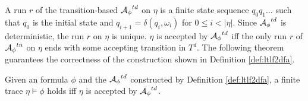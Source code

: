 A run $r$ of the transition-based \DFA ${\mathcal{A}_{\phi}}^{td}$ on $\eta$ is a finite state sequence $q_0 q_1\ldots$ such that $q_0$ is the initial state and $q_{i+1} = \delta(q_i,\omega_i)$ for $0\leq i < |\eta|$. Since ${\mathcal{A}_{\phi}}^{td}$ is deterministic, the run $r$ on $\eta$ is unique. $\eta$ is accepted by ${\mathcal{A}_{\phi}}^{td}$ iff the only run $r$ of ${\mathcal{A}_{\phi}}^{tn}$ on $\eta$ ends with some accepting transition in $T^d$. The following theorem guarantees the correctness of the \TDFA construction shown in Definition \ref{def:ltlf2dfa}. 

\begin{theorem}
Given an \ltlf formula $\phi$ and the \TDFA ${\mathcal{A}_{\phi}}^{td}$ constructed by Definition \ref{def:ltlf2dfa}, a finite trace $\eta\models\phi$ holds iff $\eta$ is accepted by ${\mathcal{A}_{\phi}}^{td}$. 
\end{theorem}
